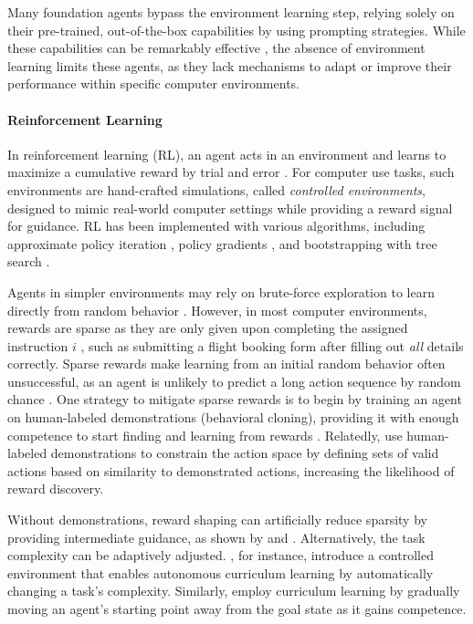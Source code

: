 Many foundation agents bypass the environment learning step, relying solely on their pre-trained, out-of-the-box capabilities by using prompting strategies. While these capabilities can be remarkably effective , the absence of environment learning limits these agents, as they lack mechanisms to adapt or improve their performance within specific computer environments.

\paragraph{Reinforcement Learning} \label{sec:environment_adaption_rl}

In reinforcement learning (RL), an agent acts in an environment and learns to maximize a cumulative reward by trial and error \citep{sutton_reinforcement_2018}.
For computer use tasks, such environments are hand-crafted simulations, called \emph{controlled environments}, designed to mimic real-world computer settings while providing a reward signal for guidance.
% 
RL has been implemented with various algorithms, including approximate policy iteration \citep{humphreys_data-driven_2022}, policy gradients \citep{shi_world_2017}, and bootstrapping with tree search \citep{shaw_pixels_2023}.

Agents in simpler environments may rely on brute-force exploration to learn directly from random behavior .
However, in most computer environments, rewards are sparse as they are only given upon completing the assigned instruction $i$ , such as submitting a flight booking form after filling out \emph{all} details correctly.
Sparse rewards make learning from an initial random behavior often unsuccessful, as an agent is unlikely to predict a long action sequence by random chance \citep{humphreys_data-driven_2022}.
One strategy to mitigate sparse rewards is to begin by training an agent on human-labeled demonstrations (behavioral cloning), providing it with enough competence to start finding and learning from rewards .
Relatedly, \citet{liu_reinforcement_2018} use human-labeled demonstrations to constrain the action space by defining sets of valid actions based on similarity to demonstrated actions, increasing the likelihood of reward discovery.

Without demonstrations, reward shaping \citep{ng1999policy} can artificially reduce sparsity by providing intermediate guidance, as shown by \citet{gur_learning_2019} and \citet{li_glider_2021}.
Alternatively, the task complexity can be adaptively adjusted. \citet{gur_environment_2021}, for instance, introduce a controlled environment that enables autonomous curriculum learning \citep{bengio2009curriculum} by automatically changing a task's complexity. Similarly, \citet{gur_learning_2019} employ curriculum learning by gradually moving an agent's starting point away from the goal state as it gains competence.

